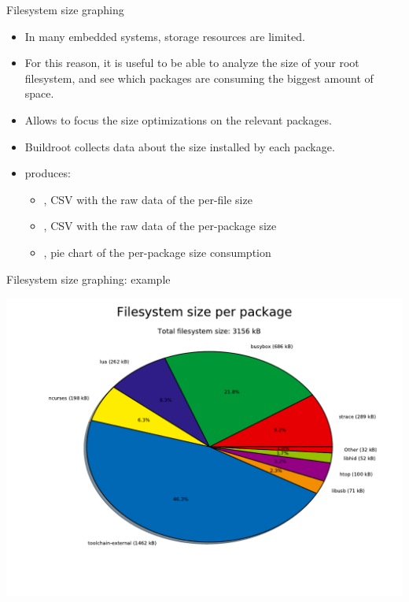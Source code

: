 \begin{frame}{Filesystem size graphing}
  \begin{itemize}
  \item In many embedded systems, storage resources are limited.
  \item For this reason, it is useful to be able to analyze the size
    of your root filesystem, and see which packages are consuming the
    biggest amount of space.
  \item Allows to focus the size optimizations on the relevant
    packages.
  \item Buildroot collects data about the size installed by each
    package.
  \item {} produces:
    \begin{itemize}
    \item {}, CSV with the raw data of the
      per-file size
    \item {}, CSV with the raw data of the
      per-package size
    \item {}, pie chart of the per-package size
      consumption
    \end{itemize}
  \end{itemize}
\end{frame}

\begin{frame}{Filesystem size graphing: example}
  \begin{center}
    \includegraphics[width=\textwidth]{slides/buildroot-analysis/graph-size.pdf}
  \end{center}
\end{frame}

